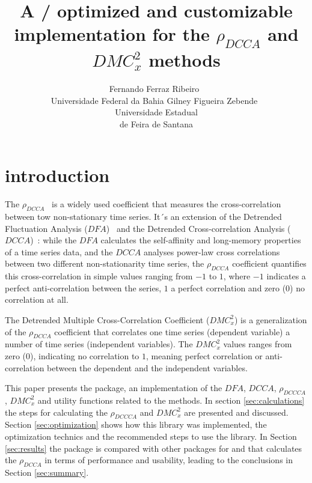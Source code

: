 \documentclass[article]{jss}
\author{Fernando Ferraz Ribeiro~\orcidlink{0000-0002-0685-4774}\\Universidade Federal da Bahia
   \And Gilney Figueira Zebende~\orcidlink{0000-0003-2420-9805}\\Universidade Estadual\\de Feira de Santana}
\title{A \proglang{Python}/\proglang{Zig} optimized and customizable implementation for the $\rho_{DCCA}$ and $DMC_x^2$ methods}
\begin{document}


\section{introduction} \label{sec:intro}

The $\rho_{DCCA}$~\citep{Zebende2011} is a widely used coefficient that measures the cross-correlation between tow non-stationary time series. It´s an extension of the Detrended Fluctuation Analysis ($DFA$)~\citep{Peng_1994} and the Detrended Cross-correlation Analysis ($DCCA$)~\citep{Podobnik2008}: while the $DFA$ calculates the self-affinity and long-memory properties of a time series data, and the $DCCA$ analyses power-law cross correlations between two different non-stationarity time series, the $\rho_{DCCA}$ coefficient quantifies this cross-correlation in simple values ranging from $-1$ to $1$, where $-1$ indicates a perfect anti-correlation between the series, $1$ a perfect correlation and zero ($0$) no correlation at all.


The Detrended Multiple Cross-Correlation Coefficient \citep{Zebende2018} ($DMC_x^2$) is a generalization of the $\rho_{DCCA}$ coefficient that correlates one time series (dependent variable) a number of time series (independent variables). The $DMC_x^2$ values ranges from zero ($0$), indicating no correlation to $1$, meaning perfect correlation or anti-correlation between the dependent and the independent variables.


This paper presents the   package, an implementation of the $DFA$, $DCCA$, $\rho_{DCCCA}$, $DMC_x^2$ and utility functions related to the methods. In section \ref{sec:calculations} the steps for calculating the $\rho_{DCCCA}$ and $DMC_x^2$ are presented and discussed. Section \ref{sec:optimization} shows how this library was implemented, the optimization technics and the recommended steps to use the library. In Section \ref{sec:results} the  package is compared with other packages for  and  that calculates the $\rho_{DCCA}$ in terms of performance and usability, leading to the conclusions in Section \ref{sec:summary}.
\end{document}
